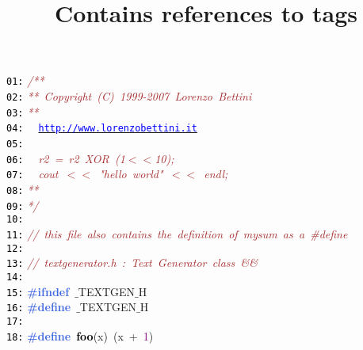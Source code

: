 \documentclass{article}
\title{Contains references to tags}
\date{}
\begin{document}
\maketitle
\noindent
\mbox{}\texttt{\textcolor{Black}{01:}} \textit{\textcolor{Brown}{/**}} \\
\mbox{}\texttt{\textcolor{Black}{02:}} \textit{\textcolor{Brown}{**\ Copyright\ (C)\ 1999-2007\ Lorenzo\ Bettini}} \\
\mbox{}\texttt{\textcolor{Black}{03:}} \textit{\textcolor{Brown}{**\ \ }} \\
\mbox{}\texttt{\textcolor{Black}{04:}} \textit{\textcolor{Brown}{\ \ }}\underline{\texttt{\textcolor{Blue}{http://www.lorenzobettini.it}}} \\
\mbox{}\texttt{\textcolor{Black}{05:}} \textit{\textcolor{Brown}{\ \ }} \\
\mbox{}\texttt{\textcolor{Black}{06:}} \textit{\textcolor{Brown}{\ \ r2\ =\ r2\ XOR\ (1$<$$<$10);}} \\
\mbox{}\texttt{\textcolor{Black}{07:}} \textit{\textcolor{Brown}{\ \ cout\ $<$$<$\ "{}hello\ world"{}\ $<$$<$\ endl;}} \\
\mbox{}\texttt{\textcolor{Black}{08:}} \textit{\textcolor{Brown}{**\ \ }} \\
\mbox{}\texttt{\textcolor{Black}{09:}} \textit{\textcolor{Brown}{*/}} \\
\mbox{}\texttt{\textcolor{Black}{10:}}  \\
\mbox{}\texttt{\textcolor{Black}{11:}} \textit{\textcolor{Brown}{//\ this\ file\ also\ contains\ the\ definition\ of\ mysum\ as\ a\ \#define}} \\
\mbox{}\texttt{\textcolor{Black}{12:}}  \\
\mbox{}\texttt{\textcolor{Black}{13:}} \textit{\textcolor{Brown}{//\ textgenerator.h\ :\ Text\ Generator\ class\ \&\&}} \\
\mbox{}\texttt{\textcolor{Black}{14:}}  \\
\mbox{}\texttt{\textcolor{Black}{15:}} \textbf{\textcolor{RoyalBlue}{\#ifndef}}\ $\_$TEXTGEN$\_$H \\
\mbox{}\texttt{\textcolor{Black}{16:}} \textbf{\textcolor{RoyalBlue}{\#define}}\ \label{test.h:16}$\_$TEXTGEN$\_$H \\
\mbox{}\texttt{\textcolor{Black}{17:}}  \\
\mbox{}\texttt{\textcolor{Black}{18:}} \textbf{\textcolor{RoyalBlue}{\#define}}\ \textbf{\textcolor{Black}{\label{test.h:18}foo}}\textcolor{BrickRed}{(}x\textcolor{BrickRed}{)}\ \textcolor{BrickRed}{(}x\ \textcolor{BrickRed}{+}\ \textcolor{Purple}{1}\textcolor{BrickRed}{)} \\
\end{document}
